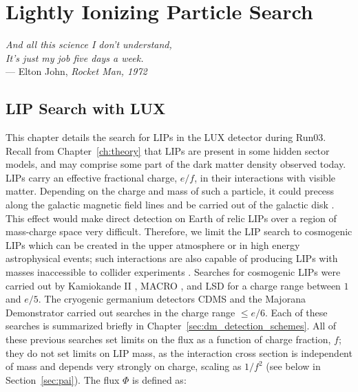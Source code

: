 \chapter{Lightly Ionizing Particle Search}

\label{ch:lips} %

\begin{flushright}{\slshape    
   And all this science I don't understand, \\
     It's just my job five days a week. } \\ \medskip
    --- {Elton John, \textit{Rocket Man, 1972}}
\end{flushright}

\section{LIP Search with LUX}
This chapter details the search for \ac{LIP}s in the \ac{LUX} detector during Run03. Recall from Chapter~\ref{ch:theory} that \ac{LIP}s are present in some hidden sector models, and may comprise some part of the dark matter density observed today. \ac{LIP}s carry an effective fractional charge, $e/f$, in their interactions with visible matter. Depending on the charge and mass of such a particle, it could precess along the galactic magnetic field lines and be carried out of the galactic disk \cite{McDermott2011}. This effect would make direct detection on Earth of relic \ac{LIP}s over a region of mass-charge space very difficult. Therefore, we limit the \ac{LIP} search to cosmogenic \ac{LIP}s which can be created in the upper atmosphere or in high energy astrophysical events; such interactions are also capable of producing \ac{LIP}s with masses inaccessible to collider experiments \cite{Agnese2015}. Searches for cosmogenic \ac{LIP}s were carried out by Kamiokande II \cite{Mori1991}, MACRO \cite{Ambrosio2000} \cite{Ambrosio2004}, and LSD \cite{Aglietta1994} for a charge range between $1$ and $e/5$. The cryogenic germanium detectors CDMS \cite{Agnese2015} and the Majorana Demonstrator \cite{Alvis2018} carried out searches in the charge range $\leqslant e/6$. Each of these searches is summarized briefly in Chapter~\ref{sec:dm_detection_schemes}. All of these previous searches set limits on the flux as a function of charge fraction, $f$; they do not set limits on \ac{LIP} mass, as the interaction cross section is independent of mass and depends very strongly on charge, scaling as $1/f^{2}$ (see below in Section~\ref{sec:pai}). The flux $\Phi$ is defined as:


